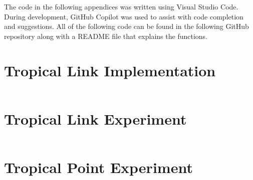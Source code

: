 \documentclass[11pt,reqno,a4paper]{article}
\theoremstyle{theoremstyle}
\theoremstyle{examplestyle}
\theoremstyle{algorithmstyle}
\numberwithin{equation}{subsection}
\begin{document}


\newpage
\printbibliography
\newpage
\begin{appendices}
The code in the following appendices was written using Visual Studio Code. During development, GitHub Copilot \cite{GitHub_Copilot} was used to assist with code completion and suggestions. All of the following code can be found in the following GitHub repository \cite{LinksGitHub} along with a README file that explains the functions.
\section{Tropical Link Implementation} \label{apx:link}
\inputminted[breaklines, breakanywhere, style = friendly, baselinestretch=1.2, fontsize = \small, linenos]{julia}{tropical_link_functions.jl}

\section{Tropical Link Experiment} \label{apx:linkexperiment}
\inputminted[breaklines, breakanywhere, style = friendly, baselinestretch=1.2, fontsize = \small, linenos]{julia}{tropical_link_experiment_functions.jl}

\section{Tropical Point Experiment} \label{apx:pointexperiment}
\inputminted[breaklines, breakanywhere, style = friendly, baselinestretch=1.2, fontsize = \small, linenos]{julia}{tropical_point_experiment_functions.jl}
\end{appendices}
\end{document}
